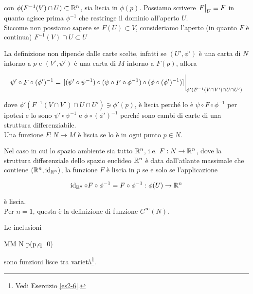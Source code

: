 con $ \phi(F^{-1}(V) \cap U) \subset \mathbb{R}^{n} $, sia liscia in $ \phi(p) $. Possiamo scrivere $ \eval{F}_{U} \equiv F $ in quanto agisce prima $ \phi^{-1} $ che restringe il dominio all'aperto $ U $.\\
Siccome non possiamo sapere se $ F(U) \subset V $, consideriamo l'aperto (in quanto $ F $ è continua) $ F^{-1}(V) \cap U \subset U $


La definizione non dipende dalle carte scelte, infatti se $ (U',\phi') $ è una carta di $ N $ intorno a $ p $ e $ (V',\psi') $ è una carta di $ M $ intorno a $ F(p) $, allora

\begin{equation}
	\psi' \circ F \circ (\phi')^{-1} = \eval{ [(\psi' \circ \psi^{-1}) \circ (\psi \circ F \circ \phi^{-1}) \circ (\phi \circ (\phi')^{-1})] }_{ \phi'(F^{-1}(V \cap V') \cap U \cap U') }
\end{equation}

dove $ \phi'(F^{-1}(V \cap V') \cap U \cap U') \ni \phi'(p) $, è liscia perché lo è $ \psi \circ F \circ \phi^{-1} $ per ipotesi e lo sono $ \psi' \circ \psi^{-1} $ e $ \phi \circ (\phi')^{-1} $ perché sono cambi di carte di una struttura differenziabile.\\
Una funzione $ F : N \to M $ è liscia se lo è in ogni punto $ p \in N $.

\begin{remark}
	Nel caso in cui lo spazio ambiente sia tutto $ \mathbb{R}^{n} $, i.e. $ F : N \to \mathbb{R}^{n} $, dove la struttura differenziale dello spazio euclideo $ \mathbb{R}^{n} $ è data dall'atlante massimale che contiene $ (\mathbb{R}^{n},\operatorname{id}_{\mathbb{R}^{n}}) $, la funzione $ F $ è liscia in $ p $ se e solo se l'applicazione
	
	\begin{equation}
		\operatorname{id}_{\mathbb{R}^{n}} \circ F \circ \phi^{-1} = F \circ \phi^{-1} : \phi(U) \to \mathbb{R}^{n}
	\end{equation}

	è liscia.\\
	Per $ n=1 $, questa è la definizione di funzione $ C^{\infty}(N) $.
\end{remark}

\begin{remark}
	Le inclusioni
	
		{M}{M \times N}
		{p}{(p,q_{0})}
	
	sono funzioni lisce tra varietà\footnote{%
		Vedi Esercizio \ref{es2-6}.%
	}.
\end{remark}

